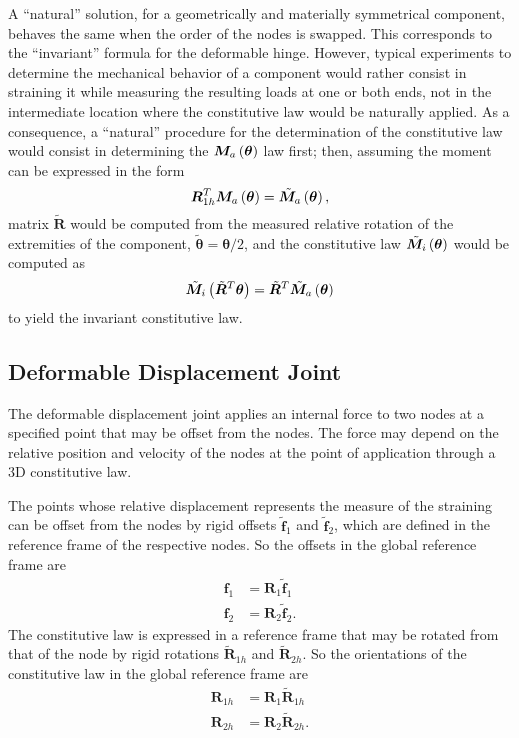 \documentclass[10pt,fleqn,subeqn]{report}
\newcommand{\T}[1]{\bm{#1}}
\begin{document}
A ``natural'' solution, for a geometrically and materially symmetrical
component, behaves the same when the order of the nodes is swapped.
This corresponds to the ``invariant'' formula for the deformable hinge.
However, typical experiments to determine the mechanical behavior
of a component would rather consist in straining it while measuring
the resulting loads at one or both ends, not in the intermediate
location where the constitutive law would be naturally applied.
As a consequence, a ``natural'' procedure for the determination
of the constitutive law would consist in determining 
the $\T{M}_a\plbr{\T{\theta}}$ law first; 
then, assuming the moment can be expressed in the form
\begin{equation}
	\T{R}_{1h}^T \T{M}_a\plbr{\T{\theta}}
		= \tilde{\T{M}}_a\plbr{\T{\theta}} ,
\end{equation}
matrix $\tilde{\T{R}}$ would be computed
from the measured relative rotation of the extremities of the component,
$\tilde{\T{\theta}}=\T{\theta}/2$,
and the constitutive law $\tilde{\T{M}}_i\plbr{\T{\theta}}$ 
would be computed as
\begin{equation}
	\tilde{\T{M}}_i\plbr{\tilde{\T{R}}^T \T{\theta}}
		= \tilde{\T{R}}^T \tilde{\T{M}}_a\plbr{\T{\theta}}
\end{equation}
to yield the invariant constitutive law.




\subsection{Deformable Displacement Joint}
\label{sec:constraints:deformable:deformable displacement joint}
The deformable displacement joint applies an internal force to two nodes
at a specified point that may be offset from the nodes.
The force may depend on the relative position and velocity of the nodes
at the point of application through a 3D constitutive law.

The points whose relative displacement represents the measure 
of the straining can be offset from the nodes by rigid offsets
$\tilde{\T{f}}_1$ and $\tilde{\T{f}}_2$, which are defined
in the reference frame of the respective nodes.
So the offsets in the global reference frame are
\begin{subequations}
\begin{align}
	\T{f}_1 &= \T{R}_1 \tilde{\T{f}}_1 \\
	\T{f}_2 &= \T{R}_2 \tilde{\T{f}}_2 .
\end{align}
\end{subequations}
The constitutive law is expressed in a reference frame that may be rotated
from that of the node by rigid rotations $\tilde{\T{R}}_{1h}$
and $\tilde{\T{R}}_{2h}$.
So the orientations of the constitutive law in the global reference frame are
\begin{subequations}
\begin{align}
	\T{R}_{1h} &= \T{R}_1 \tilde{\T{R}}_{1h} \\
	\T{R}_{2h} &= \T{R}_2 \tilde{\T{R}}_{2h} .
\end{align}
\end{subequations}
\end{document}
